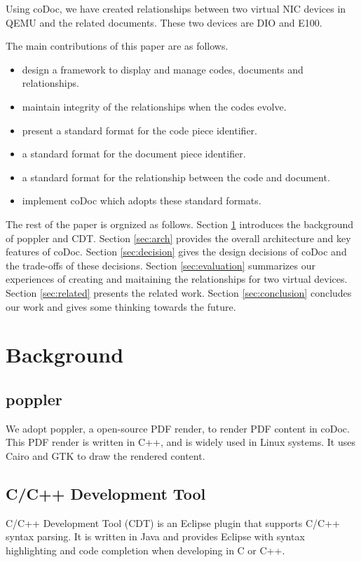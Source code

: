 \documentclass[11pt,letterpaper,oneside]{article}
\begin{document}
Using coDoc, we have created relationships between two virtual NIC devices in QEMU and the related documents.
These two devices are DIO \cite{dio} and E100.

The main contributions of this paper are as follows.
\begin{itemize}
\item design a framework to display and manage codes, documents and relationships.
\item maintain integrity of the relationships when the codes evolve.
\item present a standard format for the code piece identifier.
\item a standard format for the document piece identifier.
\item a standard format for the relationship between the code and document.
\item implement coDoc which adopts these standard formats.
\end{itemize}

The rest of the paper is orgnized as follows. 
Section \ref{sec:background} introduces the background of poppler and CDT.
Section \ref{sec:arch} provides the overall architecture and key features of coDoc.
Section \ref{sec:decision} gives the design decisions of coDoc and the trade-offs of these decisions.
Section \ref{sec:evaluation} summarizes our experiences of creating and maitaining the relationships for two virtual devices.
Section \ref{sec:related} presents the related work.
Section \ref{sec:conclusion} concludes our work and gives some thinking towards the future.


\section{Background}
\label{sec:background}
\subsection{poppler}
We adopt poppler, a open-source PDF render, to render PDF content in coDoc.
This PDF render is written in C++, 
and is widely used in Linux systems.
It uses Cairo and GTK to draw the rendered content.

\subsection{C/C++ Development Tool}
C/C++ Development Tool (CDT) is an Eclipse plugin that supports C/C++ syntax parsing.
It is written in Java and provides Eclipse with syntax highlighting and code completion when developing in C or C++.
\end{document}

